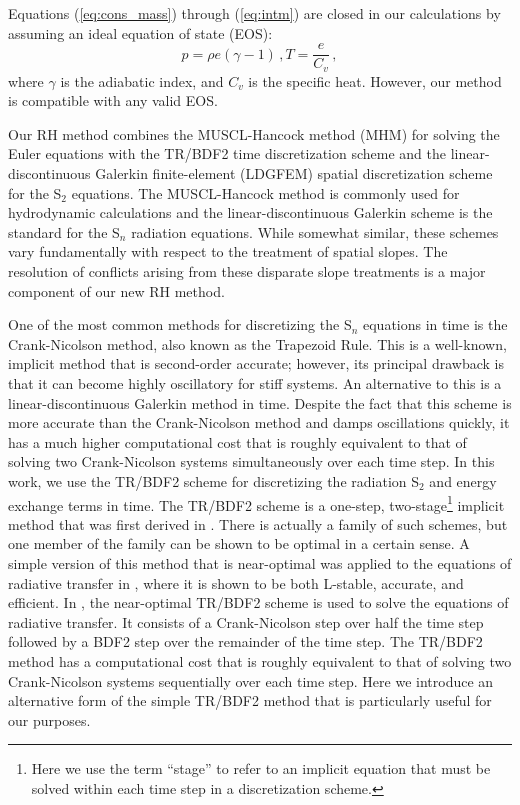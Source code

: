 \documentclass[preprint,12pt]{elsarticle}
\newcommand{\be}{\begin{equation}}
\newcommand{\ee}{\end{equation}}
\newcommand{\pec}{\, ,}
\newcommand{\lequ}[1]{\label{eq:#1}}
\newcommand{\requ}[1]{(\ref{eq:#1})}
\begin{document}
Equations \requ{cons_mass} through \requ{intm} are closed in our calculations by assuming an ideal equation of state (EOS):
\begin{subequations}
\be
p=\rho e (\gamma -1)
\lequ{pressure}
\pec
\ee
\be
T = \frac{e}{C_v} \pec
\lequ{mattemp}
\ee
\end{subequations}
where $\gamma$ is the adiabatic index, and $C_v$ is the specific heat.  However, our method is compatible with any valid EOS. 

Our RH method combines the MUSCL-Hancock method (MHM) for solving the Euler equations with the TR/BDF2 time discretization 
scheme and the linear-discontinuous Galerkin finite-element (LDGFEM) spatial discretization scheme for the S$_2$ equations.  
The MUSCL-Hancock method is commonly used for hydrodynamic calculations and the linear-discontinuous Galerkin scheme is the 
standard for the S$_n$ radiation equations.  While somewhat similar, these schemes vary fundamentally with respect to the 
treatment of spatial slopes.  The resolution of conflicts arising from these disparate 
slope treatments is a major component of our new RH method.

One of the most common methods for discretizing the S$_n$ equations in time is the Crank-Nicolson method, also known as the 
Trapezoid Rule. This is a well-known, implicit method that is second-order accurate; however, its principal drawback is that 
it can become highly oscillatory for stiff systems.  An alternative to this is a linear-discontinuous Galerkin method in time.  
Despite the fact that this scheme is more accurate than the Crank-Nicolson method and damps oscillations quickly, it has a 
much higher computational cost that is roughly equivalent to that of solving two Crank-Nicolson systems simultaneously over 
each time step.  In this work, we use the TR/BDF2 scheme for discretizing the radiation S$_2$ and energy exchange terms in time.  
The TR/BDF2 scheme is a one-step, two-stage\footnote{Here we use the term ``stage'' to refer to an implicit equation that must 
be solved within each time step in a discretization scheme.} implicit method that was first derived in \cite{bank}.   There is 
actually a family of such schemes, but one member of the family can be shown to be optimal in a certain sense.  A simple version 
of this method that is near-optimal was applied to the equations of radiative transfer in \cite{EM2011}, where it is shown to be 
both L-stable, accurate, and efficient.  In \cite{EM2011}, the near-optimal TR/BDF2 scheme is used to solve the equations of 
radiative transfer. It consists of a Crank-Nicolson step over half the time step followed by a BDF2 step over 
the remainder of the time step.  The TR/BDF2 method has a computational cost that is roughly equivalent to that of solving two 
Crank-Nicolson systems sequentially over each time step.  Here we introduce an alternative form 
of the simple TR/BDF2 method that is particularly useful for our purposes.  
\end{document}
